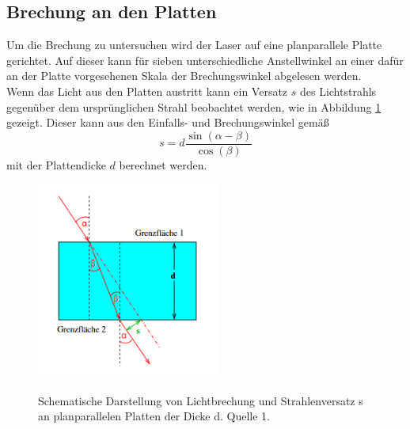 \subsection{Brechung an den Platten}
Um die Brechung zu untersuchen wird der Laser auf eine planparallele Platte gerichtet. Auf dieser kann für sieben unterschiedliche Anstellwinkel an einer dafür an der Platte vorgesehenen Skala der Brechungswinkel abgelesen werden.\\
Wenn das Licht aus den Platten austritt kann ein Versatz $s$ des Lichtstrahls gegenüber dem ursprünglichen Strahl beobachtet werden, wie in Abbildung \ref{fig:Versatz} gezeigt. Dieser kann aus den Einfalls- und Brechungswinkel gemäß
\begin{equation}
s=d \frac{\sin(\alpha - \beta)}{\cos(\beta)}
\end{equation}
mit der Plattendicke $d$ berechnet werden. \\
  \begin{figure} [h]
    \centering
    \includegraphics[width=6cm, keepaspectratio]{Planparallele Platten}
    \label{fig:Versatz}
    \caption{Schematische Darstellung von Lichtbrechung und Strahlenversatz s an planparallelen Platten der Dicke d. Quelle 1.}
 \end{figure}
